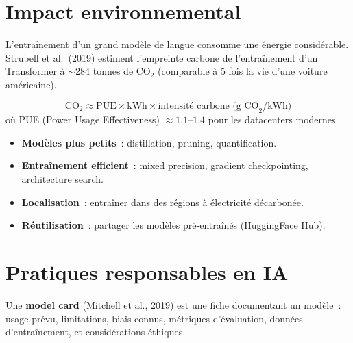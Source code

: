 \section{Impact environnemental}
\label{sec:ethique:environnement}

\begin{definition}
L'entra\^inement d'un grand mod\`ele de langue consomme une \'energie
consid\'erable. Strubell et al.\ (2019) estiment l'empreinte carbone
de l'entra\^inement d'un Transformer \`a $\sim$284 tonnes de CO$_2$
(comparable \`a 5 fois la vie d'une voiture am\'ericaine).
\end{definition}

\begin{formules}[title=\textbf{Estimation du co\^ut carbone}]
\[
    \text{CO}_2 \approx \text{PUE} \times \text{kWh} \times
    \text{intensit\'e carbone (g CO}_2\text{/kWh)}
\]
o\`u PUE (Power Usage Effectiveness) $\approx 1.1$--$1.4$ pour les
datacenters modernes.
\end{formules}

\begin{proposition}
\begin{itemize}
    \item \textbf{Mod\`eles plus petits}~: distillation, pruning,
    quantification.
    \item \textbf{Entra\^inement efficient}~: mixed precision, gradient
    checkpointing, architecture search.
    \item \textbf{Localisation}~: entra\^iner dans des r\'egions \`a
    \'electricit\'e d\'ecarbon\'ee.
    \item \textbf{R\'eutilisation}~: partager les mod\`eles pr\'e-entra\^in\'es
    (HuggingFace Hub).
\end{itemize}
\end{proposition}

\section{Pratiques responsables en IA}
\label{sec:ethique:pratiques}

\begin{definition}
Une \textbf{model card} (Mitchell et al., 2019) est une fiche
documentant un mod\`ele~: usage pr\'evu, limitations, biais connus,
m\'etriques d'\'evaluation, donn\'ees d'entra\^inement, et
consid\'erations \'ethiques.
\end{definition}

